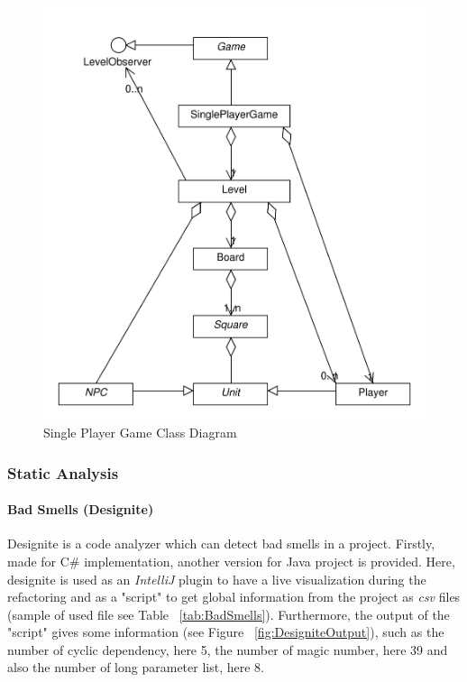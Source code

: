 \documentclass{article}
\begin{document}
\begin{figure}[h]
    \centering
    \includegraphics[scale=0.4]{imgs/SinglePlayerGame.pdf}
    \caption{Single Player Game Class Diagram}
    \label{fig:SinglePlayerGameClassDiagram}
\end{figure}

\subsubsection{Static Analysis}

\paragraph{Bad Smells (Designite)}

Designite is a code analyzer which can detect bad smells in a project. Firstly, made for C\# implementation, another version for Java project is provided. Here, designite is used as an \textit{IntelliJ} plugin to have a live visualization during the refactoring and as a "script" to get global information from the project as \textit{csv} files (sample of used file see Table ~\ref{tab:BadSmells}). Furthermore, the output of the "script" gives some information (see Figure ~\ref{fig:DesigniteOutput}), such as the number of cyclic dependency, here 5, the number of magic number, here 39 and also the number of long parameter list, here 8. \\
\end{document}
